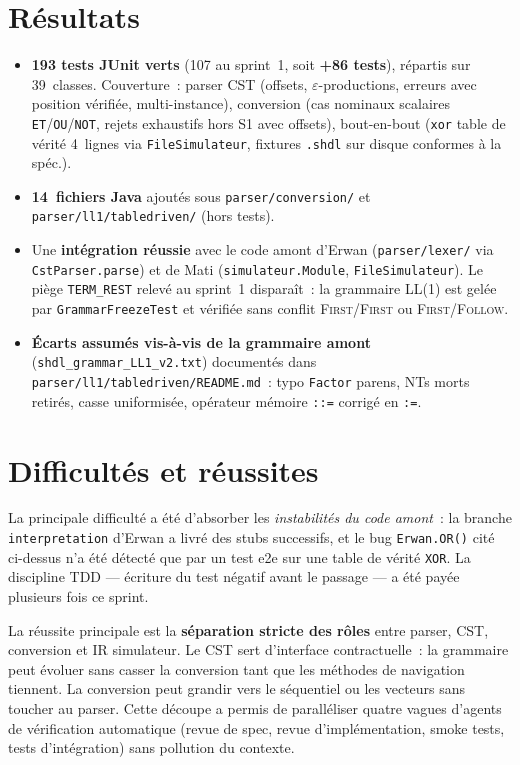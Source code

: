 \documentclass[11pt,a4paper]{article}
\begin{document}
\section*{R\'esultats}

\begin{itemize}
  \item \textbf{193 tests JUnit verts} (107 au sprint~1, soit \textbf{+86 tests}), r\'epartis sur 39~classes. Couverture~: parser CST (offsets, $\varepsilon$-productions, erreurs avec position v\'erifi\'ee, multi-instance), conversion (cas nominaux scalaires \texttt{ET}/\texttt{OU}/\texttt{NOT}, rejets exhaustifs hors S1 avec offsets), bout-en-bout (\texttt{xor} table de v\'erit\'e 4~lignes via \texttt{FileSimulateur}, fixtures \texttt{.shdl} sur disque conformes \`a la sp\'ec.).
  \item \textbf{14~fichiers Java} ajout\'es sous \texttt{parser/conversion/} et \texttt{parser/ll1/tabledriven/} (hors tests).
  \item Une \textbf{int\'egration r\'eussie} avec le code amont d'Erwan (\texttt{parser/lexer/} via \texttt{CstParser.parse}) et de Mati (\texttt{simulateur.Module}, \texttt{FileSimulateur}). Le pi\`ege \texttt{TERM\_REST} relev\'e au sprint~1 dispara\^it~: la grammaire LL(1) est gel\'ee par \texttt{GrammarFreezeTest} et v\'erifi\'ee sans conflit \textsc{First}/\textsc{First} ou \textsc{First}/\textsc{Follow}.
  \item \textbf{\'Ecarts assum\'es vis-\`a-vis de la grammaire amont} (\texttt{shdl\_grammar\_LL1\_v2.txt}) document\'es dans \texttt{parser/ll1/tabledriven/README.md}~: typo \texttt{Factor} parens, NTs morts retir\'es, casse uniformis\'ee, op\'erateur m\'emoire \texttt{::=} corrig\'e en \texttt{:=}.
\end{itemize}

\section*{Difficult\'es et r\'eussites}

La principale difficult\'e a \'et\'e d'absorber les \emph{instabilit\'es du code amont}~: la branche \texttt{interpretation} d'Erwan a livr\'e des stubs successifs, et le bug \texttt{Erwan.OR()} cit\'e ci-dessus n'a \'et\'e d\'etect\'e que par un test e2e sur une table de v\'erit\'e \texttt{XOR}. La discipline TDD --- \'ecriture du test n\'egatif avant le passage --- a \'et\'e pay\'ee plusieurs fois ce sprint.

La r\'eussite principale est la \textbf{s\'eparation stricte des r\^oles} entre parser, CST, conversion et IR simulateur. Le CST sert d'interface contractuelle~: la grammaire peut \'evoluer sans casser la conversion tant que les m\'ethodes de navigation tiennent. La conversion peut grandir vers le s\'equentiel ou les vecteurs sans toucher au parser. Cette d\'ecoupe a permis de para\-ll\'eliser quatre vagues d'agents de v\'erification automatique (revue de spec, revue d'impl\'ementation, smoke tests, tests d'int\'egration) sans pollution du contexte.
\end{document}
